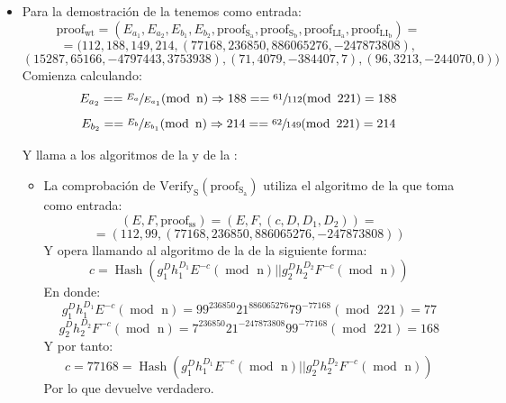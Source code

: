 \begin{itemize}
    \item Para la demostración de la  tenemos como entrada:
    $$\operatorname{proof_{wt}} = (E_{a_{1}}, E_{a_{2}}, E_{b_{1}}, E_{b_{2}}, \operatorname{proof_{S_{a}}}, \operatorname{proof_{S_{b}}}, \operatorname{proof_{LI_{a}}}, \operatorname{proof_{LI_{b}}}) =$$
    $$= (112, 188, 149, 214, (77168, 236850, 886065276, -247873808),$$ $$(15287, 65166, -4797443, 3753938), (71, 4079, -384407, 7), (96, 3213, -244070, 0))$$
    Comienza calculando:
    $$E_{a_{2}} == \sfrac{E_{a}}{E_{a_{1}}} (\operatorname{mod} \text{ n}) \Rightarrow 188 == \sfrac{61}{112} (\operatorname{mod} \text{ 221}) = 188$$
    $$E_{b_{2}} == \sfrac{E_{b}}{E_{b_{1}}} (\operatorname{mod} \text{ n}) \Rightarrow 214 == \sfrac{62}{149} (\operatorname{mod} \text{ 221}) = 214$$

    Y llama a los algoritmos de la  y de la :
    \begin{itemize}    
        \item La comprobación de $\operatorname{Verify_{S}}(\operatorname{proof_{S_{a}}})$ utiliza el algoritmo de la  que toma como entrada:
        $$(E, F, \operatorname{proof_{ss}}) = (E, F, (c, D, D_{1}, D_{2})) =$$ $$= (112, 99, (77168, 236850, 886065276, -247873808))$$
        Y opera llamando al algoritmo de la  de la siguiente forma:
        $$c = \operatorname{Hash}(g_{1}^{D}h_{1}^{D_{1}}E^{-c} (\operatorname{mod} \text{ n}) || g_{2}^{D}h_{2}^{D_{2}}F^{-c} (\operatorname{mod} \text{ n}))$$
        En donde:
        $$g_{1}^{D}h_{1}^{D_{1}}E^{-c} (\operatorname{mod} \text{ n}) = 99^{236850}21^{886065276}79^{-77168} (\operatorname{mod} \text{ 221}) = 77$$
        $$g_{2}^{D}h_{2}^{D_{2}}F^{-c} (\operatorname{mod} \text{ n}) = 7^{236850}21^{-247873808}99^{-77168} (\operatorname{mod} \text{ 221}) = 168$$
        Y por tanto:
        $$c = 77168 = \operatorname{Hash}(g_{1}^{D}h_{1}^{D_{1}}E^{-c} (\operatorname{mod} \text{ n}) || g_{2}^{D}h_{2}^{D_{2}}F^{-c} (\operatorname{mod} \text{ n}))$$
        Por lo que devuelve verdadero.
        

\end{itemize}
\end{itemize}
